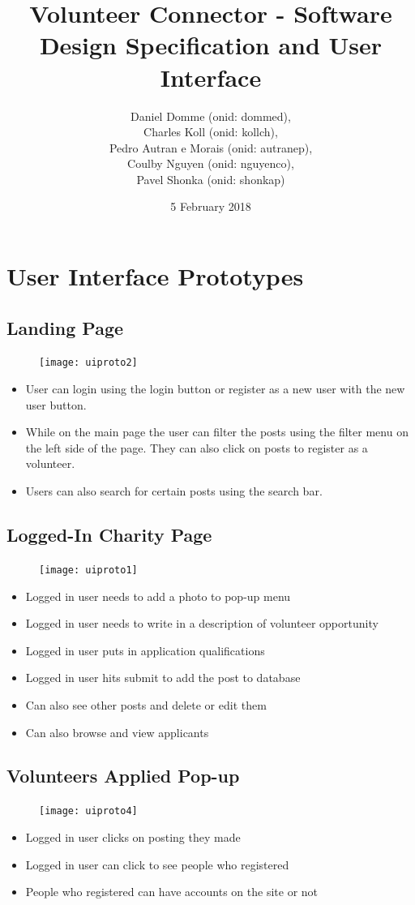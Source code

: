 \documentclass[12pt]{article}
\title{Volunteer Connector - Software Design Specification and User Interface}
\author{Daniel Domme (onid: dommed), \\
Charles Koll (onid: kollch), \\
Pedro Autran e Morais (onid: autranep), \\
Coulby Nguyen (onid: nguyenco), \\
Pavel Shonka (onid: shonkap)
}
\date{5 February 2018}
\begin{document}
\maketitle
\tableofcontents

\pagebreak
\section{User Interface Prototypes}
\subsection{Landing Page}
\begin{figure}[h!]
\texttt{[image: uiproto2]}
\end{figure}
\begin{itemize}
\item
	User can login using the login button or register as a new user with the new user
	button.
\item
	While on the main page the user can filter the posts using the filter menu on the
	left side of the page. They can also click on posts to register as a volunteer.
\item
	Users can also search for certain posts using the search bar.
\end{itemize}
\pagebreak
\subsection{Logged-In Charity Page}
\begin{figure}[h!]
\texttt{[image: uiproto1]}
\end{figure}
\begin{itemize}
\item
	Logged in user needs to add a photo to pop-up menu
\item
	Logged in user needs to write in a description of volunteer opportunity
\item
	Logged in user puts in application qualifications
\item
	Logged in user hits submit to add the post to database
\item
	Can also see other posts and delete or edit them
\item
	Can also browse and view applicants
\end{itemize}
\pagebreak
\subsection{Volunteers Applied Pop-up}
\begin{figure}[h!]
\texttt{[image: uiproto4]}
\end{figure}
\begin{itemize}
\item
	Logged in user clicks on posting they made
\item
	Logged in user can click to see people who registered
\item
	People who registered can have accounts on the site or not
\end{itemize}
\pagebreak
\end{document}
